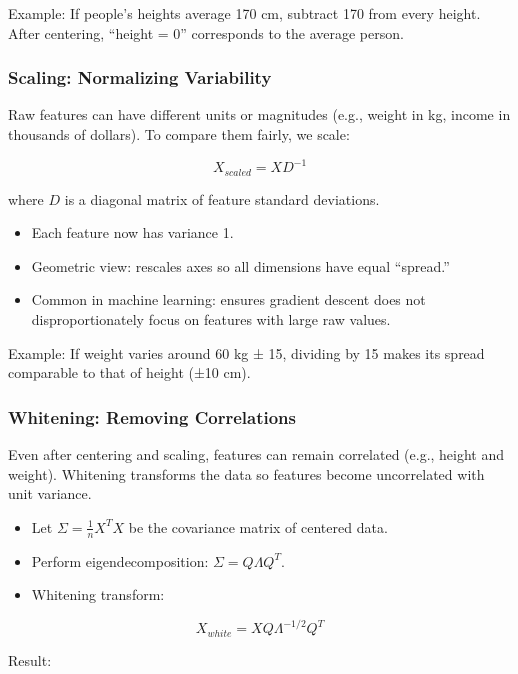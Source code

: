 \documentclass[
  letterpaper,
  DIV=11,
  numbers=noendperiod]{scrreprt}
\providecommand{\tightlist}{%
  \setlength{\itemsep}{0pt}\setlength{\parskip}{0pt}}
\begin{document}
Example: If people's heights average 170 cm, subtract 170 from every
height. After centering, ``height = 0'' corresponds to the average
person.

\subsubsection{Scaling: Normalizing
Variability}\label{scaling-normalizing-variability}

Raw features can have different units or magnitudes (e.g., weight in kg,
income in thousands of dollars). To compare them fairly, we scale:

\[
X_{scaled} = X D^{-1}
\]

where \(D\) is a diagonal matrix of feature standard deviations.

\begin{itemize}
\tightlist
\item
  Each feature now has variance 1.
\item
  Geometric view: rescales axes so all dimensions have equal ``spread.''
\item
  Common in machine learning: ensures gradient descent does not
  disproportionately focus on features with large raw values.
\end{itemize}

Example: If weight varies around 60 kg ± 15, dividing by 15 makes its
spread comparable to that of height (±10 cm).

\subsubsection{Whitening: Removing
Correlations}\label{whitening-removing-correlations}

Even after centering and scaling, features can remain correlated (e.g.,
height and weight). Whitening transforms the data so features become
uncorrelated with unit variance.

\begin{itemize}
\tightlist
\item
  Let \(\Sigma = \frac{1}{n} X^T X\) be the covariance matrix of
  centered data.
\item
  Perform eigendecomposition: \(\Sigma = Q \Lambda Q^T\).
\item
  Whitening transform:
\end{itemize}

\[
X_{white} = X Q \Lambda^{-1/2} Q^T
\]

Result:
\end{document}
